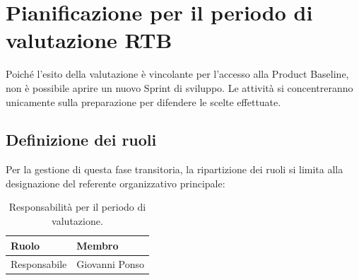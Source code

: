\documentclass[a4paper, 11pt, oneside]{scrartcl}
\begin{document}
\newpage
\section{Pianificazione per il periodo di valutazione RTB}

Poiché l'esito della valutazione è vincolante per l'accesso alla Product Baseline, non è possibile aprire un nuovo Sprint di sviluppo. Le attività si concentreranno unicamente sulla preparazione per difendere le scelte effettuate.

\subsection{Definizione dei ruoli}

Per la gestione di questa fase transitoria, la ripartizione dei ruoli si limita alla designazione del referente organizzativo principale:

\begin{table}[h!]
\centering
\begin{tabular}{@{}l l@{}}
\toprule
\textbf{Ruolo} & \textbf{Membro} \\
\midrule
Responsabile & Giovanni Ponso \\
\bottomrule
\end{tabular}
\caption{Responsabilità per il periodo di valutazione.}
\end{table}
\end{document}
